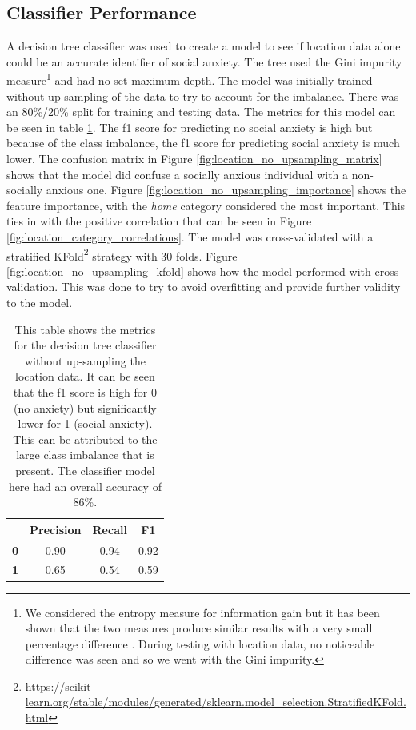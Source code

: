 \documentclass{l4proj}
\begin{document}
\subsection{Classifier Performance}
A decision tree classifier was used to create a model to see if location data alone could be an accurate identifier of social anxiety. The tree used the Gini impurity measure\footnote{We considered the entropy measure for information gain but it has been shown that the two measures produce similar results with a very small percentage difference \citep{gini_vs_entropy}. During testing with location data, no noticeable difference was seen and so we went with the Gini impurity.} and had no set maximum depth. The model was initially trained without up-sampling of the data to try to account for the imbalance. There was an 80\%/20\% split for training and testing data. The metrics for this model can be seen in table \ref{table:location_no_upsampling_metrics}. The f1 score for predicting no social anxiety is high but because of the class imbalance, the f1 score for predicting social anxiety is much lower. The confusion matrix in Figure \ref{fig:location_no_upsampling_matrix} shows that the model did confuse a socially anxious individual with a non-socially anxious one. Figure \ref{fig:location_no_upsampling_importance} shows the feature importance, with the \textit{home} category considered the most important. This ties in with the positive correlation that can be seen in Figure \ref{fig:location_category_correlations}. The model was cross-validated with a stratified KFold\footnote{\url{https://scikit-learn.org/stable/modules/generated/sklearn.model_selection.StratifiedKFold.html}} strategy with 30 folds. Figure \ref{fig:location_no_upsampling_kfold} shows how the model performed with cross-validation. This was done to try to avoid overfitting and provide further validity to the model.

\begin{table}[htb]
\centering
\begin{tabular}{@{}cccc@{}}
 & \textbf{Precision} & \textbf{Recall} & \textbf{F1} \\ \midrule
\textbf{0} & 0.90 & 0.94 & 0.92 \\
\textbf{1} & 0.65 & 0.54 & 0.59
\end{tabular}
\caption{This table shows the metrics for the decision tree classifier without up-sampling the location data. It can be seen that the f1 score is high for 0 (no anxiety) but significantly lower for 1 (social anxiety). This can be attributed to the large class imbalance that is present. The classifier model here had an overall accuracy of 86\%.}
\label{table:location_no_upsampling_metrics}
\end{table}
\end{document}
